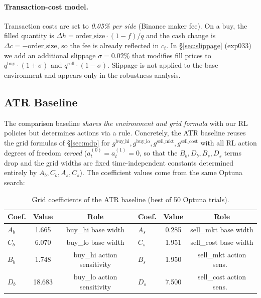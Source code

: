 \documentclass[11pt, a4paper]{article}
\begin{document}
\paragraph{Transaction-cost model.}
Transaction costs are set to \emph{0.05\% per side} (Binance maker fee). On a
buy, the filled quantity is $\Delta h = \text{order\_size} \cdot (1 - f) / q$
and the cash change is $\Delta c = -\text{order\_size}$, so the fee is already
reflected in $c_t$. In \S\ref{sec:slippage} (exp033) we add an additional
slippage $\sigma = 0.02\%$ that modifies fill prices to
$q^{\mathrm{buy}} \cdot (1 + \sigma)$ and $q^{\mathrm{sell}} \cdot (1 - \sigma)$.
Slippage is not applied to the base environment and appears only in the
robustness analysis.

\subsection{ATR Baseline}
\label{sec:atr_baseline}

The comparison baseline \emph{shares the environment and grid formula} with
our RL policies but determines actions via a rule. Concretely, the ATR
baseline reuses the grid formulas of \S\ref{sec:mdp} for $g^{\mathrm{buy\_hi}},
g^{\mathrm{buy\_lo}}, g^{\mathrm{sell\_mkt}}, g^{\mathrm{sell\_cost}}$ with all
RL action degrees of freedom \emph{zeroed} ($a_t^{(0)} = a_t^{(1)} = 0$, so
that the $B_b, D_b, B_s, D_s$ terms drop and the grid widths are fixed
time-independent constants determined entirely by $A_b, C_b, A_s, C_s$). The
coefficient values come from the same Optuna search:

\begin{table}[!htbp]
\centering
\caption{Grid coefficients of the ATR baseline (best of 50 Optuna trials).}
\begin{tabular}{lcclcc}
\toprule
Coef. & Value & Role & Coef. & Value & Role \\
\midrule
$A_b$ & 1.665 & buy\_hi base width & $A_s$ & 0.285 & sell\_mkt base width \\
$C_b$ & 6.070 & buy\_lo base width & $C_s$ & 1.951 & sell\_cost base width \\
$B_b$ & 1.748 & buy\_hi action sensitivity & $B_s$ & 1.950 & sell\_mkt action sens.\ \\
$D_b$ & 18.683 & buy\_lo action sensitivity & $D_s$ & 7.500 & sell\_cost action sens.\ \\
\bottomrule
\end{tabular}
\label{tab:atr_coefs}
\end{table}
\end{document}
